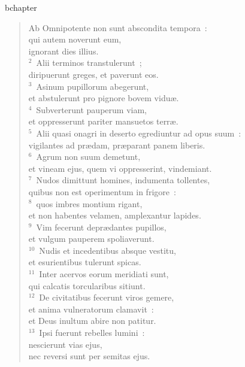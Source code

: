 bchapter\begin{flushleft}\begin{verse}\vspace{-19pt}\hspace{6pt}Ab Omnipotente non sunt abscondita tempora~:\\\hspace{6pt} qui autem noverunt eum,\\ ignorant dies illius.\\
${}^{2}$~Alii terminos transtulerunt~;\\ diripuerunt greges, et paverunt eos.\\
${}^{3}$~Asinum pupillorum abegerunt,\\ et abstulerunt pro pignore bovem vidu\ae .\\
${}^{4}$~Subverterunt pauperum viam,\\ et oppresserunt pariter mansuetos terr\ae .\\
${}^{5}$~Alii quasi onagri in deserto egrediuntur ad opus suum~:\\ vigilantes ad pr\ae dam, pr\ae parant panem liberis.\\
${}^{6}$~Agrum non suum demetunt,\\ et vineam ejus, quem vi oppresserint, vindemiant.\\
${}^{7}$~Nudos dimittunt homines, indumenta tollentes,\\ quibus non est operimentum in frigore~:\\
${}^{8}$~quos imbres montium rigant,\\ et non habentes velamen, amplexantur lapides.\\
${}^{9}$~Vim fecerunt depr\ae dantes pupillos,\\ et vulgum pauperem spoliaverunt.\\
${}^{10}$~Nudis et incedentibus absque vestitu,\\ et esurientibus tulerunt spicas.\\
${}^{11}$~Inter acervos eorum meridiati sunt,\\ qui calcatis torcularibus sitiunt.\\
${}^{12}$~De civitatibus fecerunt viros gemere,\\ et anima vulneratorum clamavit~:\\ et Deus inultum abire non patitur.\\
${}^{13}$~Ipsi fuerunt rebelles lumini~:\\ nescierunt vias ejus,\\ nec reversi sunt per semitas ejus.\\

\end{verse}
\end{flushleft}
